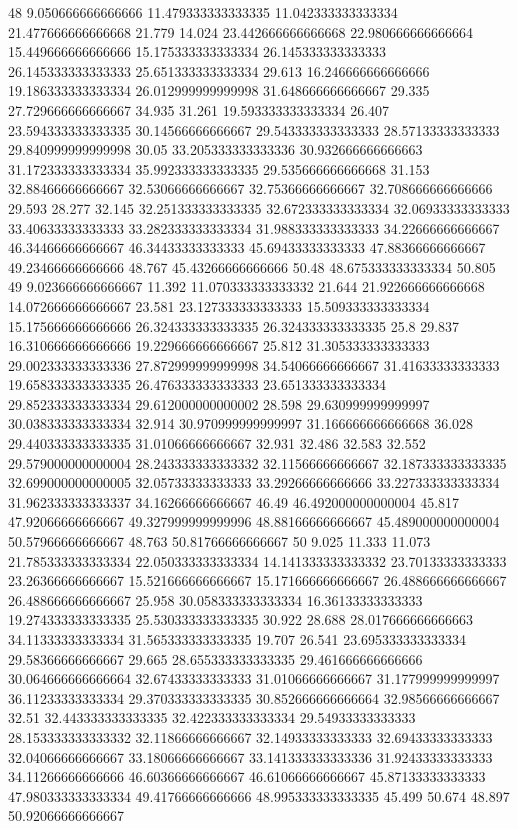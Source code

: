 48 9.050666666666666 11.479333333333335 11.042333333333334 21.477666666666668 21.779 14.024 23.442666666666668 22.980666666666664 15.449666666666666 15.175333333333334 26.145333333333333 26.145333333333333 25.651333333333334 29.613 16.246666666666666 19.186333333333334 26.012999999999998 31.648666666666667 29.335 27.729666666666667 34.935 31.261 19.593333333333334 26.407 23.594333333333335 30.14566666666667 29.543333333333333 28.57133333333333 29.840999999999998 30.05 33.205333333333336 30.932666666666663 31.172333333333334 35.992333333333335 29.535666666666668 31.153 32.88466666666667 32.53066666666667 32.75366666666667 32.708666666666666 29.593 28.277 32.145 32.251333333333335 32.672333333333334 32.06933333333333 33.40633333333333 33.282333333333334 31.988333333333333 34.22666666666667 46.34466666666667 46.34433333333333 45.69433333333333 47.88366666666667 49.23466666666666 48.767 45.43266666666666 50.48 48.675333333333334 50.805
49 9.023666666666667 11.392 11.070333333333332 21.644 21.922666666666668 14.072666666666667 23.581 23.127333333333333 15.509333333333334 15.175666666666666 26.324333333333335 26.324333333333335 25.8 29.837 16.310666666666666 19.229666666666667 25.812 31.305333333333333 29.002333333333336 27.872999999999998 34.54066666666667 31.41633333333333 19.658333333333335 26.476333333333333 23.651333333333334 29.852333333333334 29.612000000000002 28.598 29.630999999999997 30.038333333333334 32.914 30.970999999999997 31.166666666666668 36.028 29.440333333333335 31.01066666666667 32.931 32.486 32.583 32.552 29.579000000000004 28.243333333333332 32.11566666666667 32.187333333333335 32.699000000000005 32.05733333333333 33.29266666666666 33.227333333333334 31.962333333333337 34.16266666666667 46.49 46.492000000000004 45.817 47.92066666666667 49.327999999999996 48.88166666666667 45.489000000000004 50.57966666666667 48.763 50.81766666666667
50 9.025 11.333 11.073 21.785333333333334 22.050333333333334 14.141333333333332 23.70133333333333 23.26366666666667 15.521666666666667 15.171666666666667 26.488666666666667 26.488666666666667 25.958 30.058333333333334 16.36133333333333 19.274333333333335 25.530333333333335 30.922 28.688 28.017666666666663 34.11333333333334 31.565333333333335 19.707 26.541 23.695333333333334 29.58366666666667 29.665 28.655333333333335 29.461666666666666 30.064666666666664 32.67433333333333 31.01066666666667 31.177999999999997 36.11233333333334 29.370333333333335 30.852666666666664 32.98566666666667 32.51 32.443333333333335 32.422333333333334 29.54933333333333 28.153333333333332 32.11866666666667 32.14933333333333 32.69433333333333 32.04066666666667 33.18066666666667 33.141333333333336 31.92433333333333 34.11266666666666 46.60366666666667 46.61066666666667 45.87133333333333 47.980333333333334 49.41766666666666 48.995333333333335 45.499 50.674 48.897 50.92066666666667

